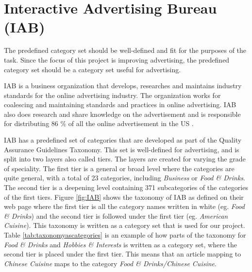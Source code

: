 \section{Interactive Advertising Bureau (IAB)}
The predefined category set should be well-defined and fit for the purposes of the task. Since the focus of this project is improving advertising, the predefined category set should be a category set useful for advertising. 




IAB is a business organization that develops, researches and maintains industry standards for the online advertising industry. The organization works for coalescing and maintaining standards and practices in online advertising. IAB also does research and share knowledge on the advertisement and is responsible for distributing 86 \% of all the online advertisement in the US \cite{IABabout}.

IAB has a predefined set of categories that are developed as part of the Quality Assurance Guidelines Taxonomy. This set is well-defined for advertising, and is split into two layers also called tiers. The layers are created for varying the grade of speciality. The first tier is a general or broad level where the categories are quite general, with a total of 23 categories, including \emph{Business} or \emph{Food \& Drinks}. The second tier is a deepening level containing 371 subcategories of the categories of the first tiers.
Figure \ref{fig:IAB} shows the taxonomy of IAB as defined on their web page where the first tier is all the category names written in white (eg. \emph{Food \& Drinks}) and the second tier is followed under the first tier (eg. \emph{American Cuisine}). This taxonomy is written as a category set that is used for our project. Table \ref{tab:taxonomyascategories} is an example of how parts of the taxonomy for \emph{Food \& Drinks} and \emph{Hobbies \& Interests} is written as a category set, where the second tier is placed under the first tier. This means that an article mapping to \emph{Chinese Cuisine} maps to the category \emph{Food \& Drinks/Chinese Cuisine}.

